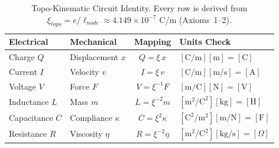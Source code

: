 %

\begin{table}[H]
\centering
\caption{Topo-Kinematic Circuit Identity.  Every row is derived from $\xi_{topo} = e/\ell_{node} \approx 4.149 \times 10^{-7}$ C/m (Axioms~1--2).}
\label{tab:trans_circuit}
\small
\renewcommand{\arraystretch}{1.3}
\begin{tabular}{@{}l l c l@{}}
\toprule
\textbf{Electrical} & \textbf{Mechanical} & \textbf{Mapping} & \textbf{Units Check} \\
\midrule
Charge $Q$        & Displacement $x$ & $Q = \xi\, x$             & $[\text{C/m}][\text{m}] = [\text{C}]$ \\
Current $I$       & Velocity $v$     & $I = \xi\, v$             & $[\text{C/m}][\text{m/s}] = [\text{A}]$ \\
Voltage $V$       & Force $F$        & $V = \xi^{-1} F$          & $[\text{m/C}][\text{N}] = [\text{V}]$ \\
Inductance $L$    & Mass $m$         & $L = \xi^{-2} m$          & $[\text{m}^2/\text{C}^2][\text{kg}] = [\text{H}]$ \\
Capacitance $C$   & Compliance $\kappa$ & $C = \xi^{2} \kappa$   & $[\text{C}^2/\text{m}^2][\text{m/N}] = [\text{F}]$ \\
Resistance $R$    & Viscosity $\eta$ & $R = \xi^{-2} \eta$       & $[\text{m}^2/\text{C}^2][\text{kg/s}] = [\Omega]$ \\
\bottomrule
\end{tabular}
\end{table}
